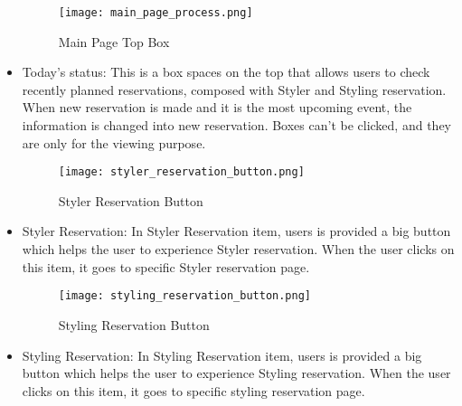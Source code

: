 \documentclass[conference]{IEEEtran}
\begin{document}
\begin{itemize}
    \begin{figure}[htbp]
    \centerline{\texttt{[image: main\_page\_process.png]}}
    \label{fig}
    \caption{Main Page Top Box}
    \end{figure}
    \item Today’s status: This is a box spaces on the top that allows users to check recently planned reservations, composed with Styler and Styling reservation. When new reservation is made and it is the most upcoming event, the information is changed into new reservation. Boxes can’t be clicked, and they are only for the viewing purpose.\\

     \begin{figure}[htbp]
    \centerline{\texttt{[image: styler\_reservation\_button.png]}}
    \label{fig}
    \caption{Styler Reservation Button}
    \end{figure}
    \item Styler Reservation: In Styler Reservation item, users is provided a big button which helps the user to experience Styler reservation. When the user clicks on this item, it goes to specific Styler reservation page.\\
    
    \begin{figure}[htbp]
    \centerline{\texttt{[image: styling\_reservation\_button.png]}}
    \label{fig}
    \caption{Styling Reservation Button}
    \end{figure}
    \item Styling Reservation: In Styling Reservation item, users is provided a big button which helps the user to experience Styling reservation. When the user clicks on this item, it goes to specific styling reservation page.\\
\end{itemize}
\end{document}
